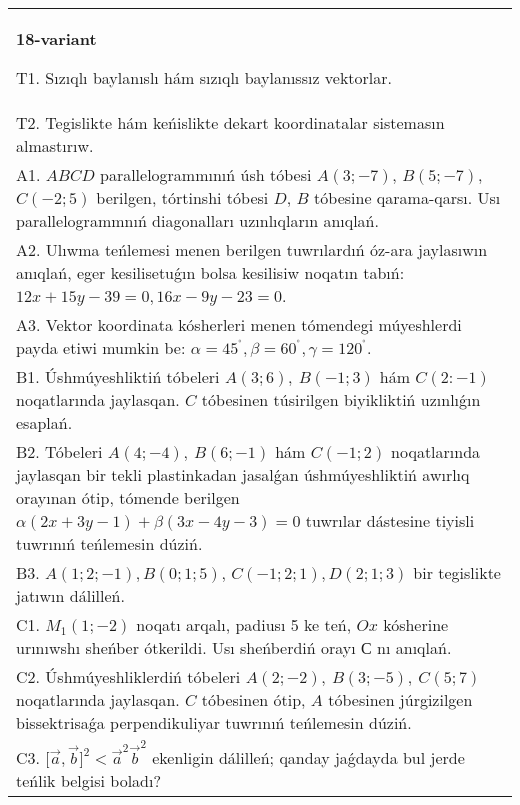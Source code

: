 \documentclass{article}
\begin{document}
\begin{tabular}{m{17cm}}
\textbf{18-variant}
\newline

T1. 
Sızıqlı baylanıslı hám sızıqlı baylanıssız vektorlar.
 \\
T2. Tegislikte hám keńislikte dekart koordinatalar sistemasın almastırıw. 
 \\
A1. 
$ABCD$ parallelogrammınıń úsh tóbesi $A(3; -7)$, 
$B(5; -7)$, $C(-2; 5)$ berilgen, tórtinshi tóbesi $D$, 
$B$ tóbesine qarama-qarsı. Usı parallelogrammnıń diagonalları
uzınlıqların anıqlań.
 \\
A2. 
Ulıwma teńlemesi menen berilgen tuwrılardıń
óz-ara jaylasıwın anıqlań, eger kesilisetuǵın bolsa kesilisiw noqatın 
tabıń: $12x+15y-39=0, 16x-9y-23=0$.
 \\
A3. Vektor koordinata kósherleri menen tómendegi múyeshlerdi payda etiwi mumkin be:
$\alpha = 45^{{^\circ}},\beta = 60^{{^\circ}},\gamma = 120^{{^\circ}}$. 
 \\
B1. 
Úshmúyeshliktiń tóbeleri \(A(3;6),\ B(-1;3)\) hám
\(C(2:-1)\) noqatlarında jaylasqan. $C$ tóbesinen túsirilgen biyikliktiń uzınlıǵın esaplań.
 \\
B2. 
Tóbeleri \(A(4;-4),\ B(6;-1)\) hám \(C(-1;2)\)
noqatlarında jaylasqan bir tekli plastinkadan jasalǵan úshmúyeshliktiń
awırlıq orayınan ótip, tómende berilgen
\(\alpha(2x+3y-1)+\beta(3x-4y-3)=0\) tuwrılar dástesine
tiyisli tuwrınıń teńlemesin dúziń.
 \\
B3. 
$A (1;2; - 1),B (0;1;5) $, $C (- 1;2;1),D (2;1;3) $ bir tegislikte jatıwın dálilleń.
 \\
C1. 
\(M_{1}(1; - 2)\) noqatı arqalı, padiusı 5 ke teń,
$Ox$ kósherine urınıwshı sheńber ótkerildi. Usı sheńberdiń orayı
$С$ nı anıqlań.
 \\
C2. 
Úshmúyeshliklerdiń tóbeleri
\(A(2; - 2),\ B(3; - 5),\ C(5;7)\) noqatlarında jaylasqan. $C$
tóbesinen ótip, $A$ tóbesinen júrgizilgen bissektrisaǵa
perpendikuliyar tuwrınıń teńlemesin dúziń.
 \\
C3. 
\(\lbrack\vec{a},\vec{b}\rbrack^{2} <  {\vec{a}}^{2}{\vec{b}}^{2}\) ekenligin dálilleń; qanday jaǵdayda bul jerde teńlik belgisi boladı?
 \\

\end{tabular}
\vspace{1cm}
\end{document}
